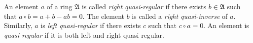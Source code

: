 An element $a$ of a ring $\mathfrak{A}$ is called \emph{right quasi-regular} if there exists $b \in \mathfrak{A}$ such that $a \circ b = a + b - ab = 0$. The element $b$ is called a \emph{right quasi-inverse} of $a$. Similarly, $a$ is \emph{left quasi-regular} if there exists $c$ such that $c \circ a = 0$. An element is \emph{quasi-regular} if it is both left and right quasi-regular.
